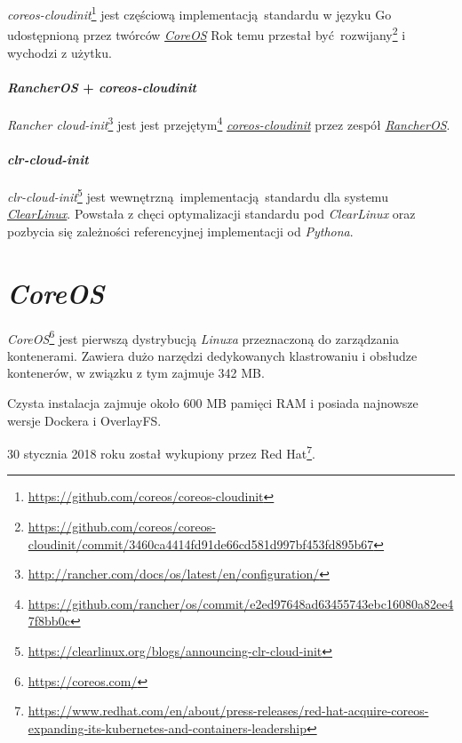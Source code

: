 \documentclass[a4paper,12pt,twoside,openany]{report}
\DeclareRobustCommand{\href}[2]{#2\footnote{\url{#1}}}
\begin{document}
\href{https://github.com/coreos/coreos-cloudinit}{\emph{coreos-cloudinit}}
jest częściową implementacją~standardu w języku Go udostępnioną przez
twórców \protect\hyperlink{coreos}{\emph{CoreOS}}
\href{https://github.com/coreos/coreos-cloudinit/commit/3460ca4414fd91de66cd581d997bf453fd895b67}{Rok
temu przestał być~rozwijany} i wychodzi z użytku.

\hypertarget{rancheros-coreos-cloudinit}{%
\paragraph{\texorpdfstring{\emph{RancherOS} +
\emph{coreos-cloudinit}}{RancherOS + coreos-cloudinit}}\label{rancheros-coreos-cloudinit}}

\href{http://rancher.com/docs/os/latest/en/configuration/}{\emph{Rancher
cloud-init}} jest jest
\href{https://github.com/rancher/os/commit/e2ed97648ad63455743ebc16080a82ee47f8bb0c}{przejętym}
\protect\hyperlink{coreos-cloudinit}{\emph{coreos-cloudinit}} przez
zespół \protect\hyperlink{rancheros}{\emph{RancherOS}}.

\hypertarget{clr-cloud-init}{%
\paragraph{\texorpdfstring{\emph{clr-cloud-init}}{clr-cloud-init}}\label{clr-cloud-init}}

\href{https://clearlinux.org/blogs/announcing-clr-cloud-init}{\emph{clr-cloud-init}}
jest wewnętrzną~implementacją~standardu dla systemu
\protect\hyperlink{clearlinux}{\emph{ClearLinux}}. Powstała z chęci
optymalizacji standardu pod \emph{ClearLinux} oraz pozbycia się
zależności referencyjnej implementacji od \emph{Pythona}.

\hypertarget{coreos}{%
\section{\texorpdfstring{\emph{CoreOS}}{CoreOS}}\label{coreos}}

\href{https://coreos.com/}{\emph{CoreOS}} jest pierwszą dystrybucją
\emph{Linuxa} przeznaczoną do zarządzania kontenerami. Zawiera dużo
narzędzi dedykowanych klastrowaniu i obsłudze kontenerów, w związku z
tym zajmuje 342 MB.

Czysta instalacja zajmuje około 600 MB pamięci RAM i posiada najnowsze
wersje Dockera i OverlayFS.

30 stycznia 2018 roku
\href{https://www.redhat.com/en/about/press-releases/red-hat-acquire-coreos-expanding-its-kubernetes-and-containers-leadership}{został
wykupiony przez Red Hat}.
\end{document}
